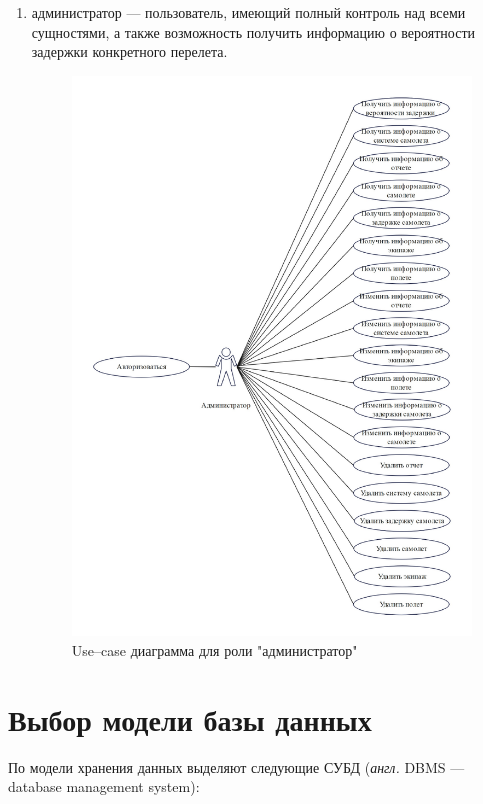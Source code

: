 \begin{enumerate}[label=\arabic*)]
    \item администратор --- пользователь, имеющий полный контроль над всеми сущностями, а также возможность получить информацию о вероятности задержки конкретного перелета.
    \begin{figure}[H]
        \centering
        \includegraphics[scale=0.7]{inc/Admin_role}
        \caption{Use--case диаграмма для роли "администратор"}
        \label{fig:admin_role}
    \end{figure}
\end{enumerate}
\newpage


\section{Выбор модели базы данных}

По модели хранения данных выделяют следующие СУБД \newline(\textit{англ.} DBMS --- database management system):

